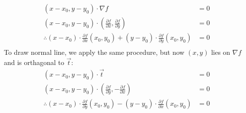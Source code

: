 \begin{itemize}
\begin{theorem}
		\begin{align*}
			\left( x-x_0,y-y_0 \right) \cdot \nabla f &=  0 \\
			\left( x-x_0,y-y_0 \right) \cdot \left( \frac{\partial f}{\partial x} , \frac{\partial f}{\partial y}  \right) &= 0 \\
			\therefore \left( x-x_0 \right) \cdot \frac{\partial f }{\partial x} \left( x_0,y_0 \right) +\left( y-y_0 \right) \cdot \frac{\partial f}{\partial y} \left( x_0,y_0 \right) &= 0 \\
		\end{align*}
		To draw normal line, we apply the same procedure, but now $\left( x,y \right) $ lies on $\nabla f$ and is orthagonal to $\vec{t}$:
		\begin{align*}
			\left( x-x_0,y-y_0 \right) \cdot \vec{t} &=  0 \\
			\left( x-x_0,y-y_0 \right) \cdot \left( \frac{\partial f}{\partial y} , -\frac{\partial f}{\partial x}  \right) &= 0 \\
			\therefore \left( x-x_0 \right) \cdot \frac{\partial f }{\partial y} \left( x_0,y_0 \right) -\left( y-y_0 \right) \cdot \frac{\partial f}{\partial x} \left( x_0,y_0 \right) &= 0 \\
		\end{align*}
	\end{theorem}

\end{itemize}
